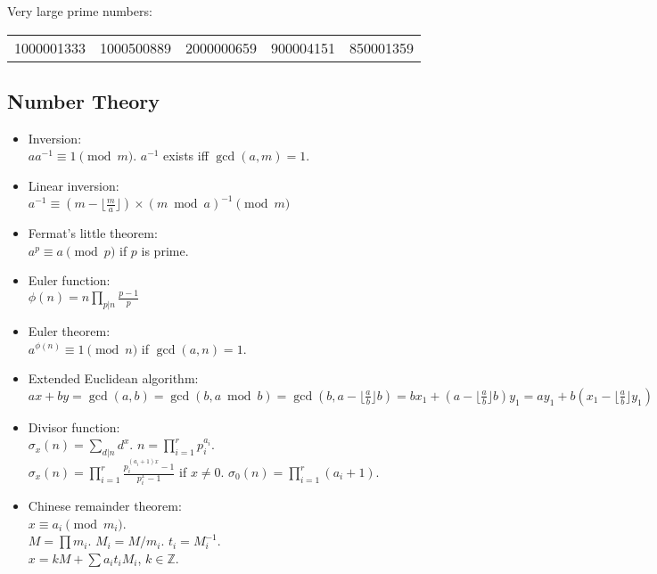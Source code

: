 \documentclass[twocolumn]{article}
\begin{document}
Very large prime numbers:\\
\begin{tabular}{ccccc}
    1000001333 & 1000500889 & 2000000659 & 900004151 & 850001359
\end{tabular}

\subsection{Number Theory}

\begin{itemize}
    \item Inversion:\\ $aa^{-1} \equiv 1 \pmod{m}$. $a^{-1}$ exists iff $\gcd(a,m)=1$.
    \item Linear inversion:\\ $a^{-1} \equiv (m - \lfloor\frac{m}{a}\rfloor) \times (m \bmod a)^{-1} \pmod{m}$
    \item Fermat's little theorem:\\ $a^p \equiv a \pmod{p}$ if $p$ is prime.
    \item Euler function:\\ $\phi(n)=n \prod_{p|n} \frac{p-1}{p}$
    \item Euler theorem:\\ $a^{\phi(n)} \equiv 1 \pmod{n}$ if $\gcd(a,n) = 1$.
    \item Extended Euclidean algorithm:\\
    $ax+by=\gcd(a,b)=\gcd(b, a \bmod b)=\gcd(b, a-\lfloor\frac{a}{b}\rfloor b)=bx_1+(a-\lfloor\frac{a}{b}\rfloor b)y_1=ay_1+b(x_1-\lfloor\frac{a}{b}\rfloor y_1)$
    \item Divisor function:\\ $\sigma_x(n) = \sum_{d|n}d^x$. $n=\prod_{i=1}^r p_i^{a_i}$.\\ $\sigma_x(n)=\prod_{i=1}^r \frac{p_i^{(a_i+1)x}-1}{p_i^x-1}$ if $x \neq 0$. $\sigma_0(n)=\prod_{i=1}^r (a_i+1)$.
    \item Chinese remainder theorem:\\ $x \equiv a_i \pmod{m_i}$.\\
        $M=\prod m_i$. $M_i=M/m_i$. $t_i=M_i^{-1}$.\\
        $x = kM + \sum a_i t_i M_i$, $k \in \mathbb{Z}$.
\end{itemize}
\end{document}
